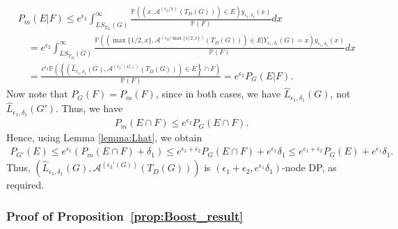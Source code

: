 \documentclass{article}
\begin{document}
\begin{align*}
& P_{m}(E|F) \leq e^{\epsilon_2}\int_{LS_{T_D}(G)}^{\infty}\frac{\mathbb{P}\left((x, \mathcal{A}^{(\epsilon_2/x)}(T_D(G))) \in E\right)y_{\epsilon_1, \delta_1}(x)}{\mathbb{P}(F)}dx\\
& \quad = e^{\epsilon_2}\int_{LS_{T_D}(G)}^{\infty}\frac{\mathbb{P}\left((\max\{1/2, x\}, \mathcal{A}^{(\epsilon_2/\max\{1/2, x\})}(T_D(G))) \in E|Y_{\epsilon_1, \delta_1}(G) = x\right)y_{\epsilon_1, \delta_1}(x)}{\mathbb{P}(F)}dx\\
& \quad = \frac{e^{\epsilon_2}\mathbb{P}\left(\left\{(\hat{L}_{\epsilon_1, \delta_1}(G), \mathcal{A}^{\left(\epsilon_2'(G)\right)}(T_D(G)))\in E\right\} \cap F\right)}{\mathbb{P}(F)} = e^{\epsilon_2}P_{G}(E|F).
\end{align*}
Now note that $P_{G}(F) = P_{m}(F)$, since in both cases, we have $\hat{L}_{\epsilon_1, \delta_1}(G)$, not $\hat{L}_{\epsilon_1, \delta_1}(G')$. Thus, we have
\begin{align*}
P_{m}(E \cap F) \leq e^{\epsilon_2}P_{G}(E \cap F).
\end{align*}
Hence, using Lemma \ref{lemma:Lhat}, we obtain 
\begin{align*}
P_{G'}(E) \leq e^{\epsilon_1}(P_m(E \cap F) + \delta_1) \leq e^{\epsilon_1 + \epsilon_2}P_G(E \cap F) + e^{\epsilon_1}\delta_1 \leq e^{\epsilon_1 + \epsilon_2}P_G(E) + e^{\epsilon_1}\delta_1.
\end{align*}
Thus, $(\hat{L}_{\epsilon_1, \delta_1}(G), \mathcal{A}^{\left(\epsilon_2'(G)\right)}(T_D(G)))$ is $(\epsilon_1 + \epsilon_2, e^{\epsilon_1}\delta_1)$-node DP, as required.


\subsubsection{Proof of Proposition~\ref{prop:Boost_result}}
\label{AppPropBoost}
\end{document}
